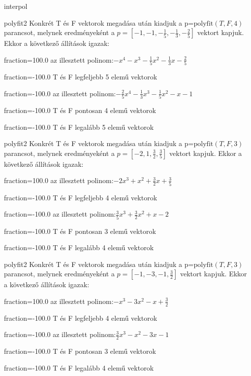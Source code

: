 \documentclass[12pt]{article}
\begin{document}
\begin{quiz}{interpol}
\begin{multi}[multiple]{polyfit2}
Konkrét T és F vektorok megadása után kiadjuk a p=$\mathrm{polyfit}(T,F,4)$
parancsot, melynek eredményeként a $p=\left[-1,-1,-\frac{1}{5},-\frac{1}{3},-\frac{2}{5}\right]$ vektort kapjuk.
Ekkor a következő állítások igazak:
\item[fraction=100.0] az illesztett polinom:$-x^4-x^3-\frac{1}{5}x^2-\frac{1}{3}x-\frac{2}{5}$
\item[fraction=-100.0]  T és F legfeljebb 5 elemű vektorok
\item[fraction=-100.0]  az illesztett polinom:$-\frac{2}{5}x^4-\frac{1}{3}x^3-\frac{1}{5}x^2-x-1$
\item[fraction=-100.0]  T és F pontosan 4 elemű vektorok
\item[fraction=-100.0] T és F legalább 5 elemű vektorok
\end{multi}
\begin{multi}[multiple]{polyfit2}
Konkrét T és F vektorok megadása után kiadjuk a p=$\mathrm{polyfit}(T,F,3)$
parancsot, melynek eredményeként a $p=\left[-2,1,\frac{3}{2},\frac{3}{5}\right]$ vektort kapjuk.
Ekkor a következő állítások igazak:
\item[fraction=100.0] az illesztett polinom:$-2x^3+x^2+\frac{3}{2}x+\frac{3}{5}$
\item[fraction=-100.0]  T és F legfeljebb 4 elemű vektorok
\item[fraction=-100.0]  az illesztett polinom:$\frac{3}{5}x^3+\frac{3}{2}x^2+x-2$
\item[fraction=-100.0]  T és F pontosan 3 elemű vektorok
\item[fraction=-100.0] T és F legalább 4 elemű vektorok
\end{multi}
\begin{multi}[multiple]{polyfit2}
Konkrét T és F vektorok megadása után kiadjuk a p=$\mathrm{polyfit}(T,F,3)$
parancsot, melynek eredményeként a $p=\left[-1,-3,-1,\frac{3}{2}\right]$ vektort kapjuk.
Ekkor a következő állítások igazak:
\item[fraction=100.0] az illesztett polinom:$-x^3-3x^2-x+\frac{3}{2}$
\item[fraction=-100.0]  T és F legfeljebb 4 elemű vektorok
\item[fraction=-100.0]  az illesztett polinom:$\frac{3}{2}x^3-x^2-3x-1$
\item[fraction=-100.0]  T és F pontosan 3 elemű vektorok
\item[fraction=-100.0] T és F legalább 4 elemű vektorok
\end{multi}

\end{quiz}
\end{document}
